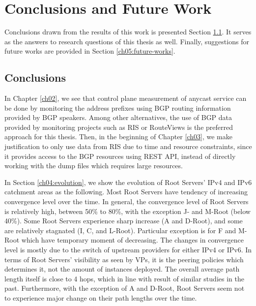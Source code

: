 \chapter{Conclusions and Future Work}
\label{ch05}
Conclusions drawn from the results of this work is presented  Section \ref{ch05:conclusions}. It serves as the answers to research questions of this thesis as well. Finally, suggestions for future works are provided in Section \ref{ch05:future-works}.
\section{Conclusions}
\label{ch05:conclusions}

In Chapter \ref{ch02}, we see that control plane measurement of anycast service can be done by monitoring the address prefixes using BGP routing information provided by BGP speakers.  Among other alternatives, the use of BGP data provided by monitoring projects such as RIS or RouteViews is the preferred approach for this thesis. Then, in the beginning of Chapter \ref{ch03}, we make justification to only use data from RIS due to time and resource constraints, since it provides access to the BGP resources using REST API, instead of directly working with the dump files which requires large resources.

In Section \ref{ch04:evolution}, we show the evolution of Root Servers' IPv4 and IPv6 catchment areas  as the following. Most Root Servers have tendency of increasing convergence level over the time. In general, the convergence level of Root Servers is relatively high, between 50\% to 80\%, with the exception J- and M-Root (below 40\%). Some Root Servers experience sharp increase (A and D-Root),  and some are relatively stagnated (I, C, and L-Root). Particular exception is for F and M-Root which have temporary moment of decreasing. The changes in convergence level is mostly due to the switch of upstream providers for either IPv4 or IPv6. In terms of Root Servers' visibility as seen by VPs, it is the peering policies which determines it, not the amount of instances deployed. The overall average path length itself is close to 4 hops, which in line with result of similar studies in the past. Furthermore, with the exception of A and D-Root, Root Servers seem not to experience major change on their path lengths over the time.

